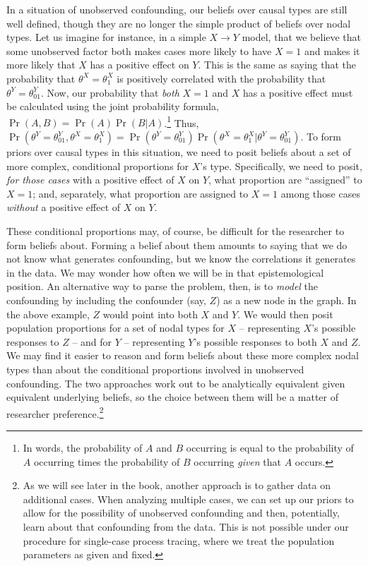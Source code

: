 \documentclass[12pt,]{book}
\let\rmarkdownfootnote\footnote%
\def\footnote{\protect\rmarkdownfootnote}
\begin{document}
In a situation of unobserved confounding, our beliefs over causal types are still well defined, though they are no longer the simple product of beliefs over nodal types. Let us imagine for instance, in a simple \(X \rightarrow Y\) model, that we believe that some unobserved factor both makes cases more likely to have \(X = 1\) and makes it more likely that \(X\) has a positive effect on \(Y\). This is the same as saying that the probability that \(\theta^X = \theta^X_1\) is positively correlated with the probability that \(\theta^Y = \theta^Y_{01}\). Now, our probability that \emph{both} \(X=1\) and \(X\) has a positive effect must be calculated using the joint probability formula, \(\Pr(A, B) = \Pr(A)\Pr(B|A)\).\footnote{In words, the probability of \(A\) and \(B\) occurring is equal to the probability of \(A\) occurring times the probability of \(B\) occurring \emph{given} that \(A\) occurs.} Thus, \(\Pr(\theta^Y = \theta^Y_{01}, \theta^X = \theta^X_1) = \Pr(\theta^Y = \theta^Y_{01})\Pr(\theta^X = \theta^X_1 | \theta^Y = \theta^Y_{01})\). To form priors over causal types in this situation, we need to posit beliefs about a set of more complex, conditional proportions for \(X\)'s type. Specifically, we need to posit, \emph{for those cases} with a positive effect of \(X\) on \(Y\), what proportion are ``assigned'' to \(X=1\); and, separately, what proportion are assigned to \(X=1\) among those cases \emph{without} a positive effect of \(X\) on \(Y\).

These conditional proportions may, of course, be difficult for the researcher to form beliefs about. Forming a belief about them amounts to saying that we do not know what generates confounding, but we know the correlations it generates in the data. We may wonder how often we will be in that epistemological position. An alternative way to parse the problem, then, is to \emph{model} the confounding by including the confounder (say, \(Z\)) as a new node in the graph. In the above example, \(Z\) would point into both \(X\) and \(Y\). We would then posit population proportions for a set of nodal types for \(X\) -- representing \(X\)'s possible responses to \(Z\) -- and for \(Y\) -- representing \(Y\)'s possible responses to both \(X\) and \(Z\). We may find it easier to reason and form beliefs about these more complex nodal types than about the conditional proportions involved in unobserved confounding. The two approaches work out to be analytically equivalent given equivalent underlying beliefs, so the choice between them will be a matter of researcher preference.\footnote{As we will see later in the book, another approach is to gather data on additional cases. When analyzing multiple cases, we can set up our priors to allow for the possibility of unobserved confounding and then, potentially, learn about that confounding from the data. This is not possible under our procedure for single-case process tracing, where we treat the population parameters as given and fixed.}
\end{document}
